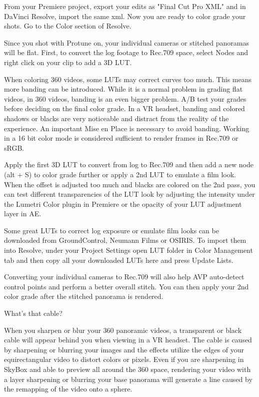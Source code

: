 \begin{fullwidth}
From your Premiere project, export your edits as "Final Cut Pro XML" and in DaVinci Resolve, import the same xml. Now you are ready to color grade your shots. Go to the Color section of Resolve.


Since you shot with Protune on, your individual cameras or stitched panoramas will be flat. First, to convert the log footage to Rec.709 space, select Nodes and right click on your clip to add a 3D LUT. 


When coloring 360 videos, some LUTs may correct curves too much. This means more banding can be introduced. While it is a normal problem in grading flat videos, in 360 videos, banding is an even bigger problem. A/B test your grades before deciding on the final color grade. In a VR headset, banding and colored shadows or blacks are very noticeable and distract from the reality of the experience. An important Mise en Place is necessary to avoid banding. Working in a 16 bit color mode is considered sufficient to render frames in Rec.709 or sRGB.


Apply the first 3D LUT to convert from log to Rec.709 and then add a new node (alt + S) to color grade further or apply a 2nd LUT to emulate a film look. When the offset is adjusted too much and blacks are colored on the 2nd pass, you can test different transparencies of the LUT look by adjusting the intensity under the Lumetri Color plugin in Premiere or the opacity of your LUT adjustment layer in AE.


\tip Some great LUTs to correct log exposure or emulate film looks can be downloaded from GroundControl, Neumann Films or OSIRIS. To import them into Resolve, under your Project Settings open LUT folder in Color Management tab and then copy all your downloaded LUTs here and press Update Lists.  

Converting your individual cameras to Rec.709 will also help AVP auto-detect control points and perform a better overall stitch. You can then apply your 2nd color grade after the stitched panorama is rendered.

{\large What's that cable? \par}

When you sharpen or blur your 360 panoramic videos, a transparent or black cable will appear behind you when viewing in a VR headset. The cable is caused by sharpening or blurring your images and the effects utilize the edges of your equirectangular video to distort colors or pixels. Even if you are sharpening in SkyBox and able to preview all around the 360 space, rendering your video with a layer sharpening or blurring your base panorama will generate a line caused by the remapping of the video onto a sphere.


\end{fullwidth}
